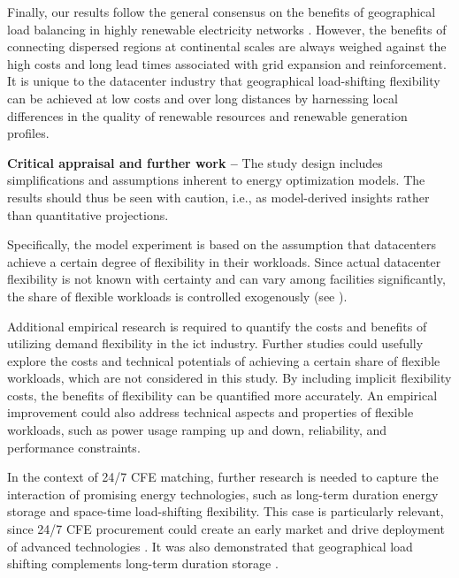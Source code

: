 Finally, our results follow the general consensus on the benefits of geographical load balancing in highly renewable electricity networks \cite{schlachtbergerBenefitsCooperationHighly2017}.
However, the benefits of connecting dispersed regions at continental scales are always weighed against the high costs and long lead times associated with grid expansion and reinforcement.
It is unique to the datacenter industry that geographical load-shifting flexibility can be achieved at low costs and over long distances by harnessing local differences in the quality of renewable resources and renewable generation profiles.

\textbf{Critical appraisal and further work --} The study design includes simplifications and assumptions inherent to energy optimization models. The results should thus be seen with caution, i.e., as model-derived insights rather than quantitative projections.

Specifically, the model experiment is based on the assumption that datacenters achieve a certain degree of flexibility in their workloads.
Since actual datacenter flexibility is not known with certainty and can vary among facilities significantly, the share of flexible workloads is controlled exogenously (see ).

Additional empirical research is required to quantify the costs and benefits of utilizing demand flexibility in the \gls{ict} industry.
Further studies could usefully explore the costs and technical potentials of achieving a certain share of flexible workloads, which are not considered in this study.
By including implicit flexibility costs, the benefits of flexibility can be quantified more accurately.
An empirical improvement could also address technical aspects and properties of flexible workloads, such as power usage ramping up and down, reliability, and performance constraints.

In the context of 24/7 CFE matching, further research is needed to capture the interaction of promising energy technologies, such as long-term duration energy storage and space-time load-shifting flexibility.
This case is particularly relevant, since 24/7 CFE procurement could create an early market and drive deployment of advanced technologies \cite{xu-247CFE-report,riepinMeansCostsSystemlevel2023}.
It was also demonstrated that geographical load shifting complements long-term duration storage \cite{riepinValueSpacetimeLoadshifting2023}.

